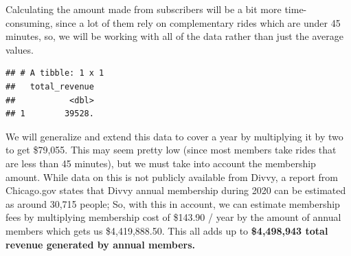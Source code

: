 \documentclass[
]{article}
\newenvironment{Shaded}{\begin{snugshade}}{\end{snugshade}}
\newcommand{\AttributeTok}[1]{\textcolor[rgb]{0.13,0.29,0.53}{#1}}
\newcommand{\CommentTok}[1]{\textcolor[rgb]{0.56,0.35,0.01}{\textit{#1}}}
\newcommand{\ControlFlowTok}[1]{\textcolor[rgb]{0.13,0.29,0.53}{\textbf{#1}}}
\newcommand{\DecValTok}[1]{\textcolor[rgb]{0.00,0.00,0.81}{#1}}
\newcommand{\FloatTok}[1]{\textcolor[rgb]{0.00,0.00,0.81}{#1}}
\newcommand{\FunctionTok}[1]{\textcolor[rgb]{0.13,0.29,0.53}{\textbf{#1}}}
\newcommand{\NormalTok}[1]{#1}
\newcommand{\OtherTok}[1]{\textcolor[rgb]{0.56,0.35,0.01}{#1}}
\newcommand{\SpecialCharTok}[1]{\textcolor[rgb]{0.81,0.36,0.00}{\textbf{#1}}}
\newcommand{\StringTok}[1]{\textcolor[rgb]{0.31,0.60,0.02}{#1}}
\begin{document}
Calculating the amount made from subscribers will be a bit more
time-consuming, since a lot of them rely on complementary rides which
are under 45 minutes, so, we will be working with all of the data rather
than just the average values.

\begin{Shaded}
\end{Shaded}

\begin{verbatim}
## # A tibble: 1 x 1
##   total_revenue
##           <dbl>
## 1        39528.
\end{verbatim}

We will generalize and extend this data to cover a year by multiplying
it by two to get \$79,055. This may seem pretty low (since most members
take rides that are less than 45 minutes), but we must take into account
the membership amount. While data on this is not publicly available from
Divvy, a report from Chicago.gov states that Divvy annual membership
during 2020 can be estimated as around 30,715 people; So, with this in
account, we can estimate membership fees by multiplying membership cost
of \$143.90 / year by the amount of annual members which gets us
\$4,419,888.50. This all adds up to \textbf{\$4,498,943 total revenue
generated by annual members.}
\end{document}
